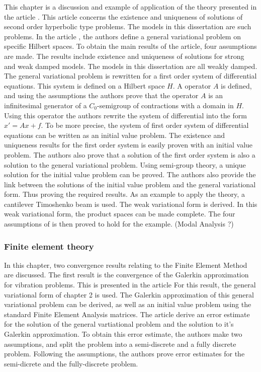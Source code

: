 \documentclass[../main.tex]{subfiles}
\begin{document}
This chapter is a discussion and example of application of the theory presented in the article \cite{VV02}. This article concerns the existence and uniqueness of solutions of second order hyperbolic type problems. The models in this dissertation are such problems. In the article \cite{VV02}, the authors define a general variational problem on specific Hilbert spaces. To obtain the main results of the article, four assumptions are made. The results include existence and uniqueness of solutions for strong and weak damped models. The models in this dissertation are all weakly damped. The general variational problem is rewritten for a first order system of differential equations. This system is defined on a Hilbert space $H$. A operator $A$ is defined, and using the assumptions the authors prove that the operator $A$ is an infinitesimal generator of a $C_0$-semigroup of contractions with a domain in $H$. Using this operator the authors rewrite the system of differential into the form $\displaystyle x' = Ax + f$. To be more precise, the system of first order system of differential equations can be written as an initial value problem. The existence and uniqueness results for the first order system is easily proven with an initial value problem. The authors also prove that a solution of the first order system is also a solution to the general variational problem. Using semi-group theory, a unique solution for the initial value problem can be proved. The authors also provide the link between the solutions of the initial value problem and the general variational form. Thus proving the required results. As an example to apply the theory, a cantilever Timoshenko beam is used. The weak variational form is derived. In this weak variational form, the product spaces can be made complete. The four assumptions of \cite{VV02} is then proved to hold for the example. (Modal Analysis ?)

\subsubsection{Finite element theory}

In this chapter, two convergence results relating to the Finite Element Method are discussed. The first result is the convergence of the Galerkin approximation for vibration problems. This is presented in the article \cite{BV13.} For this result, the general variational form of chapter 2 is used. The Galerkin approximation of this general variational problem can be derived, as well as an initial value problem using the standard Finite Element Analysis matrices. The article \cite{BV13} derive an error estimate for the solution of the general vartiational problem and the solution to it's Galerkin approximation. To obtain this error estimate, the authors make two assumptions, and split the problem into a semi-discrete and a fully discrete problem. Following the assumptions, the authors prove error estimates for the semi-dicrete and the fully-discrete problem.\\ 
\end{document}
